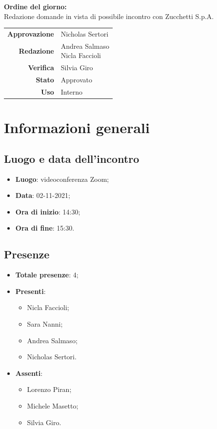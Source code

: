 \documentclass[11pt]{article}
\begin{document}
\begin{titlepage}
\begin{center}
			\large
			
			\vfill
			\textbf{Ordine del giorno:} \\
			Redazione domande in vista di possibile incontro con Zucchetti S.p.A.
			\vfill
			
			\begin{tabular}{r|l}
				\textbf{Approvazione} &  Nicholas Sertori\\
				\textbf{Redazione} &  \parbox[t]{3.5cm}{Andrea Salmaso \\Nicla Faccioli}\\
				\textbf{Verifica} &  Silvia Giro\\
				\textbf{Stato} & Approvato \\
				\textbf{Uso} & Interno
			\end{tabular}
			\vfill
			
		\end{center}
	\end{titlepage}

	\newpage

	\section{Informazioni generali}
	\subsection{Luogo e data dell'incontro}
	\begin{itemize}
		\item \textbf{Luogo}: videoconferenza Zoom;
		\item \textbf{Data}: 02-11-2021;
		\item \textbf{Ora di inizio}: 14:30;
		\item \textbf{Ora di fine}: 15:30.
	\end{itemize}
	
	\subsection{Presenze}
	\begin{itemize}
		\item \textbf{Totale presenze}: 4;
		\item \textbf{Presenti}:
		\begin{itemize}
			\item Nicla Faccioli;
			\item Sara Nanni;
			\item Andrea Salmaso;
			\item Nicholas Sertori.
		\end{itemize}
		\item \textbf{Assenti}:
		\begin{itemize}
			\item Lorenzo Piran;
			\item Michele Masetto;
			\item Silvia Giro.
		\end{itemize}
	\end{itemize}
\end{document}

